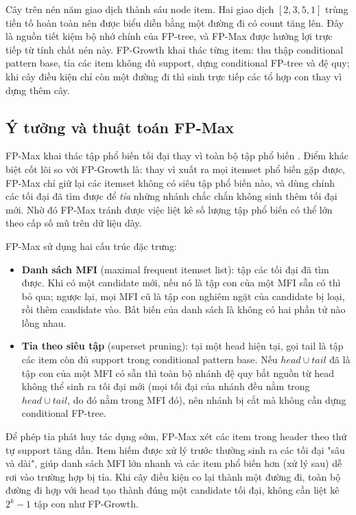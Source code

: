 Cây trên nén năm giao dịch thành sáu node item. Hai giao dịch $[2,3,5,1]$ trùng tiền tố hoàn toàn nên được biểu diễn bằng một đường đi có count tăng lên. Đây là nguồn tiết kiệm bộ nhớ chính của FP-tree, và FP-Max được hưởng lợi trực tiếp từ tính chất nén này. FP-Growth khai thác từng item: thu thập conditional pattern base, tỉa các item không đủ support, dựng conditional FP-tree và đệ quy; khi cây điều kiện chỉ còn một đường đi thì sinh trực tiếp các tổ hợp con thay vì dựng thêm cây.

\subsection{Ý tưởng và thuật toán FP-Max}

FP-Max khai thác tập phổ biến tối đại thay vì toàn bộ tập phổ biến \cite{Grahne2003FPMax}. Điểm khác biệt cốt lõi so với FP-Growth là: thay vì xuất ra mọi itemset phổ biến gặp được, FP-Max chỉ giữ lại các itemset không có siêu tập phổ biến nào, và dùng chính các tối đại đã tìm được để \emph{tỉa} những nhánh chắc chắn không sinh thêm tối đại mới. Nhờ đó FP-Max tránh được việc liệt kê số lượng tập phổ biến có thể lớn theo cấp số mũ trên dữ liệu dày.

FP-Max sử dụng hai cấu trúc đặc trưng:

\begin{itemize}
    \item \textbf{Danh sách MFI} (maximal frequent itemset list): tập các tối đại đã tìm được. Khi có một candidate mới, nếu nó là tập con của một MFI sẵn có thì bỏ qua; ngược lại, mọi MFI cũ là tập con nghiêm ngặt của candidate bị loại, rồi thêm candidate vào. Bất biến của danh sách là không có hai phần tử nào lồng nhau.
    \item \textbf{Tỉa theo siêu tập} (superset pruning): tại một head hiện tại, gọi tail là tập các item còn đủ support trong conditional pattern base. Nếu $head \cup tail$ đã là tập con của một MFI có sẵn thì toàn bộ nhánh đệ quy bắt nguồn từ head không thể sinh ra tối đại mới (mọi tối đại của nhánh đều nằm trong $head \cup tail$, do đó nằm trong MFI đó), nên nhánh bị cắt mà không cần dựng conditional FP-tree.
\end{itemize}

Để phép tỉa phát huy tác dụng sớm, FP-Max xét các item trong header theo thứ tự support tăng dần. Item hiếm được xử lý trước thường sinh ra các tối đại "sâu và dài", giúp danh sách MFI lớn nhanh và các item phổ biến hơn (xử lý sau) dễ rơi vào trường hợp bị tỉa. Khi cây điều kiện co lại thành một đường đi, toàn bộ đường đi hợp với head tạo thành đúng một candidate tối đại, không cần liệt kê $2^k-1$ tập con như FP-Growth.

